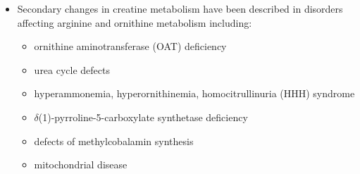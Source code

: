\documentclass{scrartcl}
\begin{document}
\begin{itemize}
\item Secondary changes in creatine metabolism have been described in
disorders affecting arginine and ornithine metabolism including:
\begin{itemize}
\item ornithine aminotransferase (OAT) deficiency
\item urea cycle defects
\item hyperammonemia, hyperornithinemia, homocitrullinuria (HHH) syndrome
\item \(\delta\)(1)-pyrroline-5-carboxylate synthetase deficiency
\item defects of methylcobalamin synthesis
\item mitochondrial disease
\end{itemize}
\end{itemize}
\end{document}
